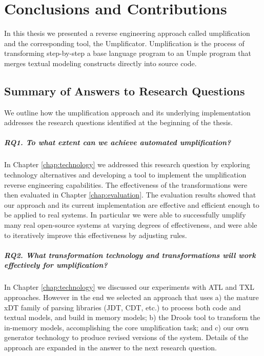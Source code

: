 \lhead{\emph{\leftmark}}  %
\chapter{Conclusions and Contributions}
\label{chap:conclusion}
In this thesis we presented a reverse engineering approach called umplification and the corresponding tool, the Umplificator. Umplification is the process of transforming step-by-step a base language program to an Umple program that merges textual modeling constructs directly into source code. 

\section{Summary of Answers to Research Questions}

We outline how the umplification approach and its underlying implementation addresses the  research questions identified at the beginning of the thesis.

\paragraph*{RQ1. To what extent can we achieve automated umplification?}

In Chapter \ref{chap:technology} we addressed this research question by exploring technology alternatives and developing a tool to implement the umplification reverse engineering capabilities. The effectiveness of the transformations were then evaluated in Chapter \ref{chap:evaluation}. The evaluation results showed that our approach and its current implementation are effective and efficient enough to be applied to real systems. In particular we were able to successfully umplify many real open-source systems at varying degrees of effectiveness, and were able to iteratively improve this effectiveness by adjusting rules.
 
\paragraph*{RQ2. What transformation technology and transformations  will work effectively for umplification?}

In Chapter \ref{chap:technology}  we discussed our experiments with ATL and TXL approaches. However in the end we selected an approach that uses a) the mature xDT family of parsing libraries (JDT, CDT, etc.) to process both code and textual models, and build in memory models; b) the Drools tool to transform the in-memory models, accomplishing the core umplification task; and c) our own generator technology to produce revised versions of the system. Details of the approach are expanded in the answer to the next research question.

